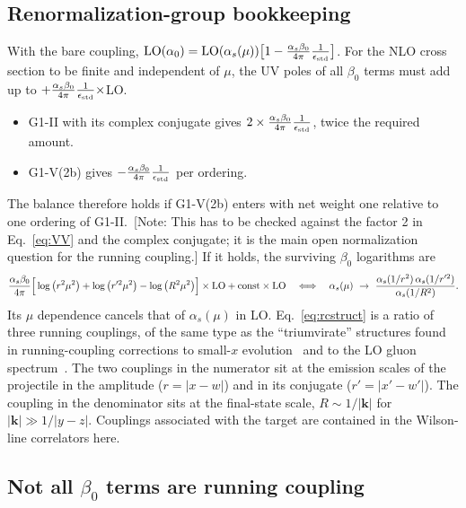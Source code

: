 \documentclass[aps,prd,onecolumn,superscriptaddress,nofootinbib,floatfix,longbibliography,11pt]{revtex4-2}
\numberwithin{equation}{section}
\newif\ifshownotes \shownotestrue
\newcommand{\note}[1]{\ifshownotes{\color{red}\,[\textsf{Note:} #1]}\fi}
\begin{document}
\subsection{Renormalization-group bookkeeping}\label{sec:RG}

With the bare coupling, ${\rm LO}(\alpha_0)={\rm LO}(\alpha_s(\mu))\big[1-\frac{\alpha_s\beta_0}{4\pi}\frac{1}{\epsilon_{\rm std}}\big]$. For the NLO cross section to be finite and independent of $\mu$, the UV poles of all $\beta_0$ terms must add up to $+\frac{\alpha_s\beta_0}{4\pi}\frac{1}{\epsilon_{\rm std}}\times$LO.
\begin{itemize}
\item G1-II with its complex conjugate gives $2\times\frac{\alpha_s\beta_0}{4\pi}\frac{1}{\epsilon_{\rm std}}$, twice the required amount.
\item G1-V(2b) gives $-\frac{\alpha_s\beta_0}{4\pi}\frac{1}{\epsilon_{\rm std}}$ per ordering.
\end{itemize}
The balance therefore holds if G1-V(2b) enters with net weight one relative to one ordering of G1-II.
\note{This has to be checked against the factor 2 in Eq.~\eqref{eq:VV} and the complex conjugate; it is the main open normalization question for the running coupling.}
If it holds, the surviving $\beta_0$ logarithms are
\begin{equation}
\frac{\alpha_s\beta_0}{4\pi}\Big[\log\big(r^2\mu^2\big)+\log\big(r'^2\mu^2\big)-\log\big(R^2\mu^2\big)\Big]\times{\rm LO}+\text{const}\times{\rm LO}\quad\Longleftrightarrow\quad\alpha_s(\mu)\ \to\ \frac{\alpha_s(1/r^2)\,\alpha_s(1/r'^2)}{\alpha_s(1/R^2)}.
\label{eq:rcstruct}
\end{equation}
Its $\mu$ dependence cancels that of $\alpha_s(\mu)$ in LO. Eq.~\eqref{eq:rcstruct} is a ratio of three running couplings, of the same type as the ``triumvirate'' structures found in running-coupling corrections to small-$x$ evolution~\cite{Balitsky:2006wa,Kovchegov:2006vj} and to the LO gluon spectrum~\cite{Horowitz:2010yg}. The two couplings in the numerator sit at the emission scales of the projectile in the amplitude ($r=|x-w|$) and in its conjugate ($r'=|x'-w'|$). The coupling in the denominator sits at the final-state scale, $R\sim1/|\mathbf k|$ for $|\mathbf k|\gg1/|y-z|$. Couplings associated with the target are contained in the Wilson-line correlators here.

\subsection{Not all \texorpdfstring{$\beta_0$}{beta0} terms are running coupling}\label{sec:KLSZ}
\end{document}
